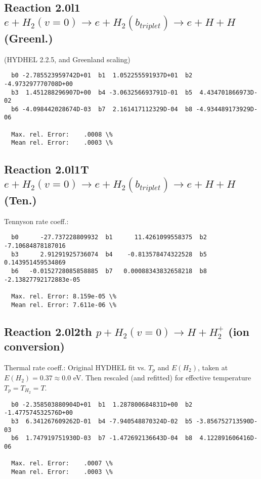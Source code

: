 \documentclass[12pt,dvipdfmx]{article}
\begin{document}
\subsection{
Reaction 2.0l1
$ e + H_2(v=0) \rightarrow e+ H_2(b_{triplet})\rightarrow e +  H + H $ (Greenl.)
}

(HYDHEL 2.2.5, and Greenland scaling)


\begin{small}\begin{verbatim}
  b0 -2.785523959742D+01  b1  1.052255591937D+01  b2 -4.973297770708D+00
  b3  1.451288296907D+00  b4 -3.063256693791D-01  b5  4.434701866973D-02
  b6 -4.098442028674D-03  b7  2.161417112329D-04  b8 -4.934489173929D-06

  Max. rel. Error:    .0008 \%
  Mean rel. Error:    .0003 \%
\end{verbatim}\end{small}
\subsection{
Reaction 2.0l1T
$ e +  H_2(v=0) \rightarrow e+ H_2(b_{triplet})\rightarrow e + H + H $ (Ten.)
}
Tennyson rate coeff.:
\begin{small}\begin{verbatim}
  b0      -27.737228809932  b1      11.4261099558375  b2     -7.10684878187016
  b3      2.91291925736074  b4    -0.813578474322528  b5     0.143951459534869
  b6   -0.0152728085858885  b7   0.00088343832658218  b8 -2.13827792172883e-05

  Max. rel. Error: 8.159e-05 \%
  Mean rel. Error: 7.611e-06 \%
\end{verbatim}\end{small}

\subsection{
Reaction 2.0l2th
$ p + H_2(v=0) \rightarrow H + H_2^+$ (ion conversion)
}
Thermal rate coeff.:
Original HYDHEL fit vs. $T_p$ and $E(H_2)$, taken at $E(H_2) = 0.37 \approx 0.0$ eV.
Then rescaled (and refitted) for effective temperature $T_p=T_{H_2}=T$.

\begin{small}\begin{verbatim}
  b0 -2.358503880904D+01  b1  1.287800684831D+00  b2 -1.477574532576D+00
  b3  6.341267609262D-01  b4 -7.940548870324D-02  b5 -3.856752713590D-03
  b6  1.747919751930D-03  b7 -1.472692136643D-04  b8  4.122891606416D-06

  Max. rel. Error:    .0007 \%
  Mean rel. Error:    .0003 \%
\end{verbatim}\end{small}
\end{document}
